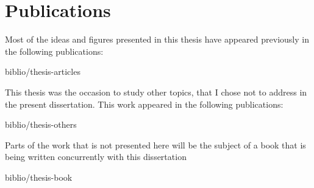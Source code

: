 

\chapter*{Publications} %

Most of the ideas and figures presented in this thesis have appeared previously in the following publications:

\smallskip


\begin{btSect}{biblio/thesis-articles}
\btPrintAll
\end{btSect}

\bigskip

This thesis was the occasion to study other topics, that I chose
not to address in the present dissertation. This work appeared in the following
publications:

\smallskip


\begin{btSect}{biblio/thesis-others}
\btPrintAll
\end{btSect}

\bigskip

Parts of the work that is not presented here will be the subject of a book that
is being written concurrently with this dissertation

\smallskip


\begin{btSect}{biblio/thesis-book}
\btPrintAll
\end{btSect}
